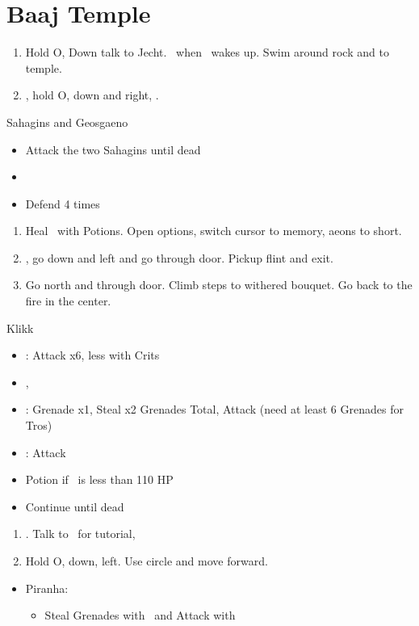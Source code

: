 \chapter{Baaj Temple}

\begin{enumerate}
  \item Hold O, Down talk to Jecht. \sd \ when \tidus \ wakes up. Swim around rock and to temple.
  \item \cs, hold O, down and right, \cs.
\end{enumerate}
\begin{battle}{Sahagins and Geosgaeno}
  \begin{itemize}
    \item Attack the two Sahagins until dead
    \item \cs[0:30]
    \item Defend 4 times
  \end{itemize}
\end{battle}
\begin{enumerate}[resume]
  \item Heal \tidus \ with Potions. Open options, switch cursor to memory, aeons to short.
  \item \cs, go down and left and go through door. Pickup flint and exit.
  \item Go north and through door. Climb steps to withered bouquet. Go back to the fire in the center. \cs[2:10]
\end{enumerate}
\begin{battle}[1500]{Klikk}
  \begin{itemize}
    \item \tidus: Attack x6, less with Crits
    \item \cs, \sd
    \item \rikku: Grenade x1, Steal x2 Grenades Total, Attack (need at least 6 Grenades for Tros)
    \item \tidus: Attack
    \item Potion if \tidus \ is less than 110 HP
    \item Continue until dead
  \end{itemize}
\end{battle}
\begin{enumerate}[resume]
  \item \cs[2:30]. Talk to \rikku \ for tutorial, \sd
  \item Hold O, down, left. Use circle and move forward.
\end{enumerate}
\begin{encounters}
  \begin{itemize}
    \item Piranha:
          \begin{itemize}
            \item Steal Grenades with \rikku \ and Attack with \tidus
          \end{itemize}
  \end{itemize}
\end{encounters}
